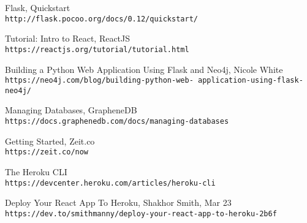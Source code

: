 \begin{thebibliography}{999}
Flask, Quickstart
\\\texttt{http://flask.pocoo.org/docs/0.12/quickstart/}

Tutorial: Intro to React, ReactJS
\\\texttt{https://reactjs.org/tutorial/tutorial.html}

Building a Python Web Application Using Flask and Neo4j, Nicole White
\\\texttt{https://neo4j.com/blog/building-python-web-
application-using-flask-neo4j/}

Managing Databases, GrapheneDB
\\\texttt{https://docs.graphenedb.com/docs/managing-databases}

Getting Started, Zeit.co
\\\texttt{https://zeit.co/now}

The Heroku CLI
\\\texttt{https://devcenter.heroku.com/articles/heroku-cli}

Deploy Your React App To Heroku,  Shakhor Smith, Mar 23
\\\texttt{https://dev.to/smithmanny/deploy-your-react-app-to-heroku-2b6f}


\end{thebibliography}

